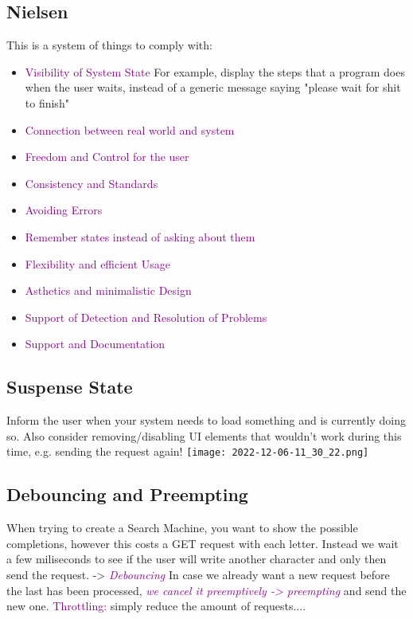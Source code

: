 \documentclass[main.tex,fontsize=6pt,paper=a4,paper=landscape,DIV=calc,]{scrartcl}
\begin{document}
\begin{multicols*}{4}
\subsection{Nielsen}  
This is a system of things to comply with:\newline
\begin{itemize}
\item \textcolor{purple}{Visibility of System State}\newline
  For example, display the steps that a program does when the user waits, instead of a generic message saying "please wait for shit to finish"
\item \textcolor{purple}{Connection between real world and system}
\item \textcolor{purple}{Freedom and Control for the user}
\item \textcolor{purple}{Consistency and Standards}
\item \textcolor{purple}{Avoiding Errors}
\item \textcolor{purple}{Remember states instead of asking about them}
\item \textcolor{purple}{Flexibility and efficient Usage}
\item \textcolor{purple}{Asthetics and minimalistic Design}
\item \textcolor{purple}{Support of Detection and Resolution of Problems}
\item \textcolor{purple}{Support and Documentation}
\end{itemize} 

\subsection{Suspense State} 
Inform the user when your system needs to load something and is currently doing so. Also consider removing/disabling UI elements that wouldn't work during this time, e.g. sending the request again!
\texttt{[image: 2022-12-06-11\_30\_22.png]}

\subsection{Debouncing and Preempting}
When trying to create a Search Machine, you want to show the possible completions, however this costs a GET request with each letter.\newline
Instead we wait a few miliseconds to see if the user will write another character and only then send the request. -> \textcolor{purple}{\emph{Debouncing}}\newline
In case we already want a new request before the last has been processed, \textcolor{purple}{\emph{we cancel it preemptively -> preempting}} and send the new one.\newline 
\textcolor{purple}{Throttling:} simply reduce the amount of requests....


\end{multicols*}
\end{document}
